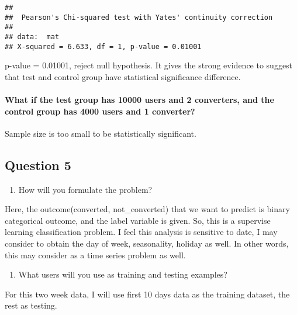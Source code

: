 \documentclass[]{article}
\providecommand{\tightlist}{%
  \setlength{\itemsep}{0pt}\setlength{\parskip}{0pt}}
\let\oldparagraph\paragraph
\renewcommand{\paragraph}[1]{\oldparagraph{#1}\mbox{}}
\begin{document}
\begin{verbatim}
## 
##  Pearson's Chi-squared test with Yates' continuity correction
## 
## data:  mat
## X-squared = 6.633, df = 1, p-value = 0.01001
\end{verbatim}

p-value = 0.01001, reject null hypothesis. It gives the strong evidence
to suggest that test and control group have statistical significance
difference.

\paragraph{What if the test group has 10000 users and 2 converters, and
the control group has 4000 users and 1
converter?}\label{what-if-the-test-group-has-10000-users-and-2-converters-and-the-control-group-has-4000-users-and-1-converter}

Sample size is too small to be statistically significant.

\subsection{Question 5}\label{question-5}

\begin{enumerate}
\def\labelenumi{\arabic{enumi}.}
\tightlist
\item
  How will you formulate the problem?
\end{enumerate}

Here, the outcome(converted, not\_converted) that we want to predict is
binary categorical outcome, and the label variable is given. So, this is
a supervise learning classification problem. I feel this analysis is
sensitive to date, I may consider to obtain the day of week,
seasonality, holiday as well. In other words, this may consider as a
time series problem as well.

\begin{enumerate}
\def\labelenumi{\arabic{enumi}.}
\setcounter{enumi}{1}
\tightlist
\item
  What users will you use as training and testing examples?
\end{enumerate}

For this two week data, I will use first 10 days data as the training
dataset, the rest as testing.
\end{document}
